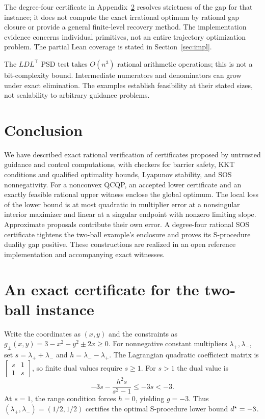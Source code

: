 \documentclass[11pt]{article}
\theoremstyle{plain}
\theoremstyle{remark}
\begin{document}
The degree-four certificate in Appendix~\ref{app:cdt} resolves strictness of the
gap for that instance; it does not compute the exact irrational optimum by
rational gap closure or provide a general finite-level recovery method.
The implementation evidence concerns individual primitives, not an entire
trajectory optimization problem. The partial Lean coverage is stated in
Section~\ref{sec:impl}.

The $LDL^\top$ PSD test takes $O(n^3)$ rational arithmetic operations; this is
not a bit-complexity bound. Intermediate numerators and denominators can grow
under exact elimination. The examples establish feasibility at their stated
sizes, not scalability to arbitrary guidance problems.

\section{Conclusion}

We have described exact rational verification of certificates proposed by
untrusted guidance and control computations, with checkers for barrier safety,
KKT conditions and qualified optimality bounds, Lyapunov stability, and SOS
nonnegativity. For a nonconvex QCQP, an accepted lower certificate and an
exactly feasible rational upper witness enclose the global optimum. The local
loss of the lower bound is at most quadratic in multiplier error at a
nonsingular interior maximizer and linear at a singular endpoint with nonzero
limiting slope. Approximate proposals contribute their own error.
A degree-four rational SOS certificate tightens the two-ball example's enclosure
and proves its S-procedure duality gap positive. These constructions are
realized in an open reference implementation and accompanying exact witnesses.

\appendix
\section{An exact certificate for the two-ball instance}
\label{app:cdt}

Write the coordinates as $(x,y)$ and the constraints as
$g_\pm(x,y)=3-x^2-y^2\pm2x\ge0$. For nonnegative constant multipliers
$\lambda_+,\lambda_-$, set $s=\lambda_++\lambda_-$ and
$h=\lambda_--\lambda_+$. The Lagrangian quadratic coefficient matrix is
$\left[\begin{smallmatrix}s&1\\1&s\end{smallmatrix}\right]$, so finite dual
values require $s\ge1$. For $s>1$ the dual value is
\[
-3s-\frac{h^2s}{s^2-1}\le-3s<-3.
\]
At $s=1$, the range condition forces $h=0$, yielding $g=-3$.
Thus $(\lambda_+,\lambda_-)=(1/2,1/2)$ certifies the optimal S-procedure
lower bound $d^\star=-3$.
\end{document}
